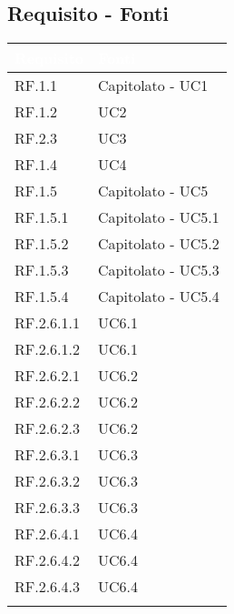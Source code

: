 \subsection{Requisito - Fonti}
\begin{center}
  \centering
  \begin{longtable}{|C{6cm}|C{6cm}|}
    \hline
    \textcolor[HTML]{FFFFFF}{\textbf{Requisito}} & \textcolor[HTML]{FFFFFF}{\textbf{Fonti}} \\ \hline
    RF.1.1 & Capitolato - UC1 \\ \hline
    RF.1.2 & UC2 \\ \hline
    RF.2.3 & UC3 \\ \hline
    RF.1.4 & UC4 \\ \hline
    RF.1.5 & Capitolato - UC5 \\ \hline
    RF.1.5.1 & Capitolato - UC5.1 \\ \hline
    RF.1.5.2 & Capitolato - UC5.2 \\ \hline
    RF.1.5.3 & Capitolato - UC5.3 \\ \hline
    RF.1.5.4 & Capitolato - UC5.4 \\ \hline
    RF.2.6.1.1 & UC6.1 \\ \hline
    RF.2.6.1.2 & UC6.1 \\ \hline
    RF.2.6.2.1 & UC6.2 \\ \hline
    RF.2.6.2.2 & UC6.2 \\ \hline
    RF.2.6.2.3 & UC6.2 \\ \hline
    RF.2.6.3.1  & UC6.3 \\ \hline
    RF.2.6.3.2  & UC6.3 \\ \hline
    RF.2.6.3.3  & UC6.3 \\ \hline
    RF.2.6.4.1 & UC6.4 \\ \hline
    RF.2.6.4.2 & UC6.4 \\ \hline
    RF.2.6.4.3 & UC6.4 \\ \hline

\end{longtable}
\end{center}
